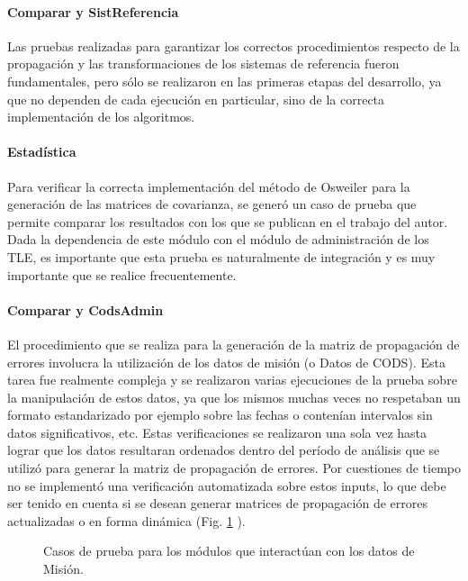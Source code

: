 \paragraph*{Comparar y SistReferencia}
Las pruebas realizadas para garantizar los correctos procedimientos respecto de la propagaci\'on y las transformaciones de los sistemas de referencia fueron fundamentales, pero s\'olo se realizaron en las primeras etapas del desarrollo, ya que no dependen de cada ejecuci\'on en particular, sino de la correcta implementaci\'on de los algoritmos.  

\paragraph*{Estad\'istica}
Para verificar la correcta implementaci\'on del m\'etodo de Osweiler para la generaci\'on de las matrices de covarianza, se gener\'o un caso de prueba que permite comparar los resultados con los que se publican en el trabajo del autor. Dada la dependencia de este m\'odulo con el m\'odulo de administraci\'on de los TLE, es importante que esta prueba es naturalmente de integraci\'on y es muy importante que se realice frecuentemente.

\paragraph*{Comparar y CodsAdmin}
El procedimiento que se realiza para la generaci\'on de la matriz de propagaci\'on de errores involucra la utilizaci\'on de los datos de misi\'on (o Datos de CODS). Esta tarea fue realmente compleja y se realizaron varias ejecuciones de la prueba sobre la manipulaci\'on de estos datos, ya que los mismos muchas veces no respetaban un formato estandarizado por ejemplo sobre las fechas o conten\'ian intervalos sin datos significativos, etc. Estas verificaciones se realizaron una sola vez hasta lograr que los datos resultaran ordenados dentro del per\'iodo de an\'alisis que se utiliz\'o para generar la matriz de propagaci\'on de errores. Por cuestiones de tiempo no se implement\'o una verificaci\'on automatizada sobre estos inputs, lo que debe ser tenido en cuenta si se desean generar matrices de propagaci\'on de errores actualizadas o en forma din\'amica (Fig. \ref{fig:pruebaCods} ).

\begin{figure}[!h]
 \centering
 \caption[Casos de Prueba I]{Casos de prueba para los módulos que interactúan con los datos de Misión.}
 \label{fig:pruebaCods}
\end{figure}

